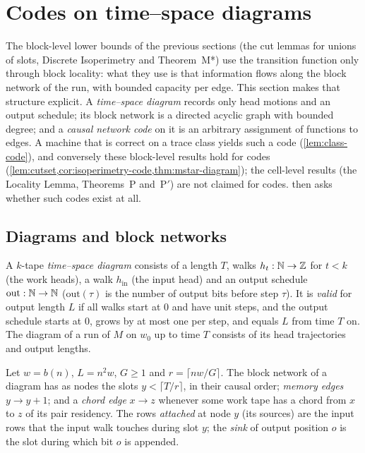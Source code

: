 \section{Codes on time--space diagrams}\label{sec:codes}

The block-level lower bounds of the previous sections (the cut lemmas for unions of slots, Discrete
Isoperimetry and Theorem~M*) use the transition function only through block locality: what they use is
that information flows along the block network of the run, with bounded capacity per edge. This section
makes that structure explicit. A \emph{time--space diagram} records only head motions and an output
schedule; its block network is a directed acyclic graph with bounded degree; and a \emph{causal network
code} on it is an arbitrary assignment of functions to edges. A machine that is correct on a trace class
yields such a code (\cref{lem:class-code}), and conversely these block-level results hold for codes
(\cref{lem:cutset,cor:isoperimetry-code,thm:mstar-diagram}); the cell-level results (the Locality Lemma,
Theorems~P and~P$'$) are not claimed for codes.  then asks whether such codes exist
at all.

\subsection{Diagrams and block networks}

\begin{definition}\label{def:diagram}
A $k$-tape \emph{time--space diagram} consists of a length $T$, walks $h_t:\mathbb{N}\to\mathbb{Z}$ for $t<k$ (the
work heads), a walk $h_{\mathrm{in}}$ (the input head) and an output schedule $\mathrm{out}:\mathbb{N}\to\mathbb{N}$
($\mathrm{out}(\tau)$ is the number of output bits before step $\tau$). It is \emph{valid} for output
length $L$ if all walks start at $0$ and have unit steps, and the output schedule starts at $0$,
grows by at most one per step, and equals $L$ from time $T$ on. The diagram of a run of $M$ on $w_0$
up to time $T$ consists of its head trajectories and output lengths.
\end{definition}

\begin{definition}\label{def:blocknet}
Let $w=b(n)$, $L=n^2w$, $G\ge1$ and $r=\lceil nw/G\rceil$. The block network of a diagram has as
nodes the slots $y<\lceil T/r\rceil$, in their causal order; \emph{memory edges} $y\to y+1$; and a
\emph{chord edge} $x\to z$ whenever some work tape has a chord from $x$ to $z$ of its pair
residency. The rows \emph{attached} at node $y$ (its sources) are the input rows that the input walk
touches during slot $y$; the \emph{sink} of output position $o$ is the slot during which bit $o$ is
appended.
\end{definition}

